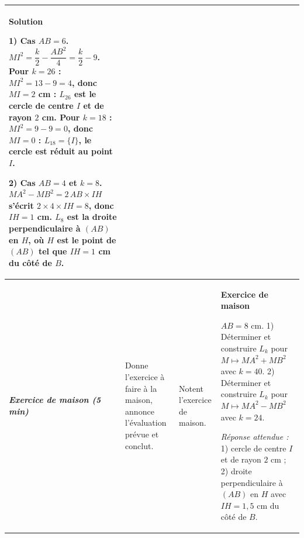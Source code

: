 \documentclass[10pt,a4paper,landscape]{article}
\newcommand{\bleu}[1]{{\color{cBleu}\bfseries #1}}                        %
\newcommand{\moment}[1]{\textbf{\itshape #1}}                             %
\begin{document}
{\begin{longtable}{|J{2.12cm}|L{5.17cm}|L{4.37cm}|L{13.64cm}|}
\bleu{Solution}

\textbf{1) Cas $AB=6$.} $MI^2=\dfrac{k}{2}-\dfrac{AB^2}{4}=\dfrac{k}{2}-9$.
Pour $k=26$ : $MI^2=13-9=4$, donc $MI=2$ cm : $L_{26}$ est le cercle de centre $I$ et de rayon $2$ cm.
Pour $k=18$ : $MI^2=9-9=0$, donc $MI=0$ : $L_{18}=\{I\}$, le cercle est réduit au point $I$.

\textbf{2) Cas $AB=4$ et $k=8$.} $MA^2-MB^2=2\,AB\times IH$ s'écrit $2\times 4\times IH=8$, donc $IH=1$ cm.
$L_8$ est la droite perpendiculaire à $(AB)$ en $H$, où $H$ est le point de $(AB)$ tel que $IH=1$ cm du côté de $B$.
\\
\hline
\moment{Exercice de maison (5 min)} &
Donne l'exercice à faire à la maison, annonce l'évaluation prévue et conclut. &
Notent l'exercice de maison. &
\bleu{Exercice de maison}

$AB=8$ cm.
1) Déterminer et construire $L_k$ pour $M\mapsto MA^2+MB^2$ avec $k=40$.
2) Déterminer et construire $L_k$ pour $M\mapsto MA^2-MB^2$ avec $k=24$.

\emph{Réponse attendue :} 1) cercle de centre $I$ et de rayon $2$ cm ; 2) droite perpendiculaire à $(AB)$ en $H$
avec $IH=1{,}5$ cm du côté de $B$.
\\
\hline
\end{longtable}}
\end{document}
